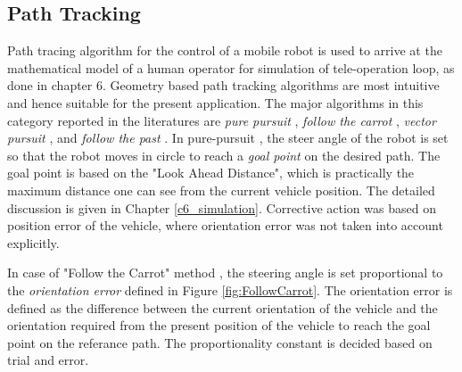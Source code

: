 \subsection{Path Tracking}
Path tracing algorithm for the control of a mobile robot is used to arrive at the mathematical model of a human operator for simulation of tele-operation loop, as done in chapter 6. Geometry based path tracking algorithms are most intuitive and hence suitable for the present application. The major algorithms in this  category reported in the literatures are \textit{pure pursuit} \cite{coulter1992implementation}, \textit{follow the carrot} \cite{barton2001controller}, \textit{vector pursuit} \cite{wit2004autonomous}, and \textit{follow the past} \cite{hellstrom2006follow}. In pure-pursuit \cite{coulter1992implementation}, the steer angle of the robot is set so that the robot moves in circle to reach a \textit{ goal point} on the desired path. The goal point is based on the "Look Ahead Distance", which is practically the maximum distance one can see from the current vehicle position. The detailed discussion is given in Chapter \ref{c6_simulation}.  Corrective action was based on  position error of the vehicle, where orientation error was not taken into account explicitly. 

In case of "Follow the Carrot" method \cite{barton2001controller},  the steering angle is set proportional to the \textit{orientation error} defined in Figure \ref{fig:FollowCarrot}. The orientation error is defined as the difference between the current orientation of the vehicle and the orientation required from the present position of the vehicle to reach the goal point on the referance path.  The proportionality constant is decided based on trial and error.

